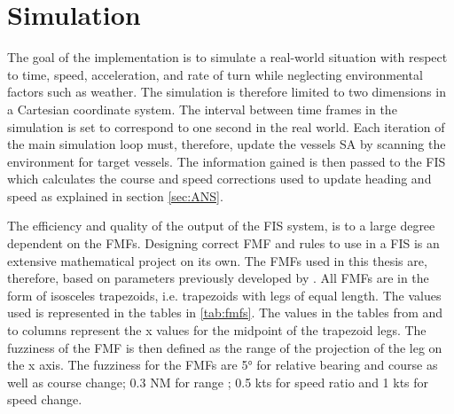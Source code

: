 \section{Simulation}
The goal of the implementation is to  simulate a real-world situation with respect to time, speed, acceleration, and rate of turn while neglecting  environmental factors such as weather.
The simulation is therefore limited to two dimensions in a Cartesian coordinate system.
The interval between time frames in the simulation is set to correspond to one second in the real world.
Each iteration of the main simulation loop must, therefore, update the vessels SA by scanning the environment for target vessels. The information gained is then passed to the FIS which calculates the course and speed corrections used to update heading and speed as explained in section \ref{sec:ANS}.

The efficiency and quality of the output of the FIS system, is to a large degree dependent on the FMFs. Designing correct FMF and rules to use in a FIS is an extensive mathematical project on its own. The FMFs used in this thesis are, therefore, based on parameters  previously developed by \textcite{perera2010smooth_param}. All FMFs are in the form of isosceles trapezoids, i.e. trapezoids with legs of equal length. The values used is represented in the tables in \ref{tab:fmfs}. The values in the tables from and to columns represent the x values for the midpoint of the trapezoid legs. The fuzziness of the FMF is then defined as the range of the projection of the leg on the x axis. The fuzziness for the FMFs are \ang{5} for relative bearing and course as well as course change; 0.3 NM for range ; 0.5 kts for speed ratio and 1 kts for speed change.

